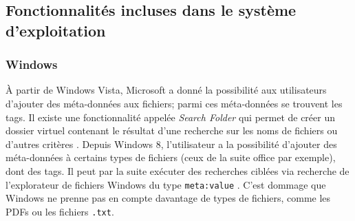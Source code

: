 \documentclass[a4paper, 12pt]{article}
\begin{document}
\subsection{Fonctionnalités incluses dans le système d'exploitation}

\subsubsection{Windows}
À partir de Windows Vista, Microsoft a donné la possibilité aux utilisateurs d'ajouter des 
méta-données aux fichiers; parmi ces méta-données se trouvent les tags. Il existe une fonctionnalité 
appelée \textit{Search Folder} qui permet de créer un dossier virtuel contenant le résultat d'une 
recherche sur les noms de fichiers ou d'autres critères \cite{ref19}. Depuis Windows 8, l'utilisateur 
a la possibilité d'ajouter des méta-données à certains types de fichiers (ceux de la suite office 
par exemple), dont des tags. Il peut par la suite exécuter des recherches ciblées via recherche de 
l'explorateur de fichiers Windows du type \texttt{meta:value} \cite{ref20}. C'est 
dommage que Windows ne prenne pas en compte davantage de types de fichiers, comme les PDFs ou les 
fichiers \texttt{.txt}.
\end{document}
